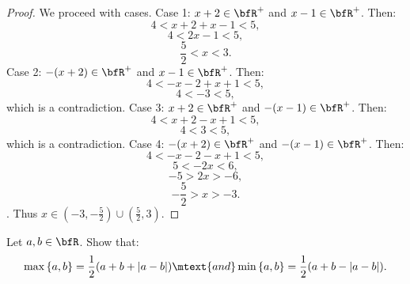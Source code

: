 \documentclass[10pt,twoside,openany]{memoir}
\begin{document}
        \begin{proof}
            We proceed with cases. Case 1: $x+2 \in \bfR^+$ and $x-1 \in \bfR^+$. Then:
                \begin{equation*}
                    4 < x+2 + x-1 < 5,
                \end{equation*}
                \begin{equation*}
                    4 < 2x-1 < 5,
                \end{equation*}
                \begin{equation*}
                    \frac{5}{2} < x < 3.
                \end{equation*}
            Case 2: $-(x+2) \in \bfR^+$ and $x-1 \in \bfR^+$. Then:
                \begin{equation*}
                    4 < -x-2 + x + 1 <5,
                \end{equation*}
                \begin{equation*}
                    4 < -3 < 5,
                \end{equation*}
            which is a contradiction. Case 3: $x+2 \in \bfR^+$ and $-(x-1) \in \bfR^+$. Then:
                \begin{equation*}
                    4 < x+2 - x + 1 < 5,
                \end{equation*}
                \begin{equation*}
                    4 < 3 < 5,
                \end{equation*}
            which is a contradiction. Case 4: $-(x+2) \in \bfR^+$ and $-(x-1) \in \bfR^+$. Then:
                \begin{equation*}
                    4 < -x-2-x+1 < 5,
                \end{equation*}
                \begin{equation*}
                    5< -2x < 6,
                \end{equation*}
                \begin{equation*}
                    -5 > 2x > -6,
                \end{equation*}
                \begin{equation*}
                    -\frac{5}{2} > x > -3.
                \end{equation*}.
            Thus $x \in (-3,-\frac{5}{2}) \cup (\frac{5}{2},3)$.
        \end{proof}
    \begin{exercise}
        Let $a,b \in \bfR$. Show that:
            \begin{equation*}
            \begin{split}
                \max{\{a,b\}} = \frac{1}{2}(a+b+\left|a-b\right|)\mtext{and}\min{\{a,b\}} = \frac{1}{2}(a+b-\left|a-b\right|).
            \end{split}
            \end{equation*}
    \end{exercise}
\end{document}
